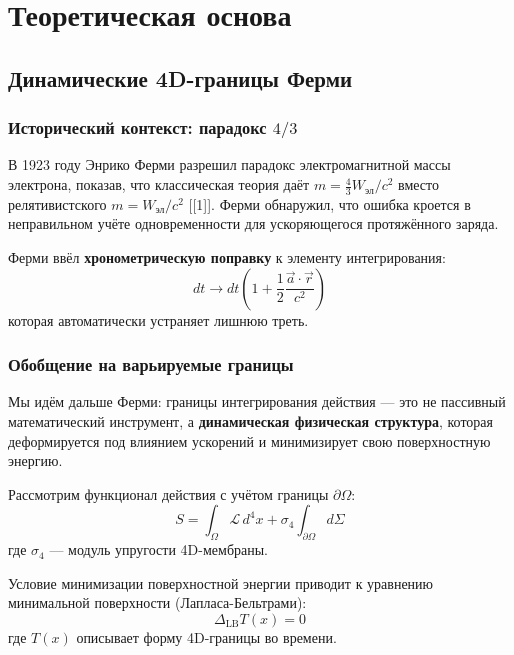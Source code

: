 \documentclass[12pt,a4paper]{article}
\begin{document}
\section{Теоретическая основа}
\label{sec:theory}

\subsection{Динамические 4D-границы Ферми}

\subsubsection{Исторический контекст: парадокс $4/3$}

В 1923 году Энрико Ферми разрешил парадокс электромагнитной массы электрона, показав, что классическая теория даёт $m = \frac{4}{3}W_{\text{эл}}/c^2$ вместо релятивистского $m = W_{\text{эл}}/c^2$ [[1]]. Ферми обнаружил, что ошибка кроется в неправильном учёте одновременности для ускоряющегося протяжённого заряда.

Ферми ввёл \textbf{хронометрическую поправку} к элементу интегрирования:
\begin{equation}
dt \to dt\left(1 + \frac{1}{2}\frac{\vec{a}\cdot\vec{r}}{c^2}\right)
\end{equation}
которая автоматически устраняет лишнюю треть.

\subsubsection{Обобщение на варьируемые границы}

Мы идём дальше Ферми: границы интегрирования действия — это не пассивный математический инструмент, а \textbf{динамическая физическая структура}, которая деформируется под влиянием ускорений и минимизирует свою поверхностную энергию.

Рассмотрим функционал действия с учётом границы $\partial\Omega$:
\begin{equation}
S = \int_{\Omega} \mathcal{L} \, d^4x + \sigma_4 \int_{\partial\Omega} d\Sigma
\end{equation}
где $\sigma_4$ — модуль упругости 4D-мембраны.

Условие минимизации поверхностной энергии приводит к уравнению минимальной поверхности (Лапласа-Бельтрами):
\begin{equation}
\Delta_{\text{LB}} T(x) = 0
\end{equation}
где $T(x)$ описывает форму 4D-границы во времени.
\end{document}
